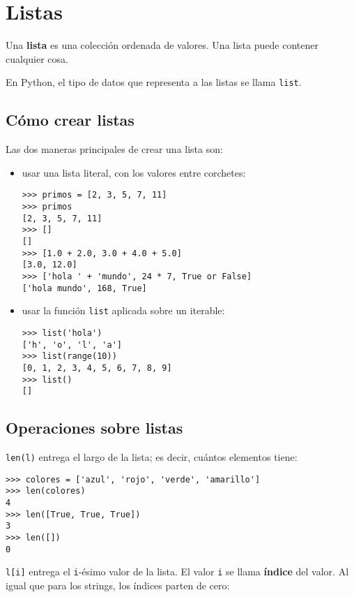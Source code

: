 \section{Listas}

Una \textbf{lista} es una colección ordenada de valores. Una lista puede
contener cualquier cosa.

En Python, el tipo de datos que representa a las listas se llama
\lstinline!list!.

\subsection{Cómo crear listas}

Las dos maneras principales de crear una lista son:

\begin{itemize}
\item
  usar una lista literal, con los valores entre corchetes:

\begin{lstlisting}
>>> primos = [2, 3, 5, 7, 11]
>>> primos
[2, 3, 5, 7, 11]
>>> []
[]
>>> [1.0 + 2.0, 3.0 + 4.0 + 5.0]
[3.0, 12.0]
>>> ['hola ' + 'mundo', 24 * 7, True or False]
['hola mundo', 168, True]
\end{lstlisting}
\end{itemize}

\begin{itemize}
\item
  usar la función \lstinline!list! aplicada sobre un iterable:

\begin{lstlisting}
>>> list('hola')
['h', 'o', 'l', 'a']
>>> list(range(10))
[0, 1, 2, 3, 4, 5, 6, 7, 8, 9]
>>> list()
[]
\end{lstlisting}
\end{itemize}

\subsection{Operaciones sobre listas}

\lstinline!len(l)! entrega el largo de la lista; es decir, cuántos
elementos tiene:

\begin{lstlisting}
>>> colores = ['azul', 'rojo', 'verde', 'amarillo']
>>> len(colores)
4
>>> len([True, True, True])
3
>>> len([])
0
\end{lstlisting}

\lstinline!l[i]! entrega el \lstinline!i!-ésimo valor de la lista. El
valor \lstinline!i! se llama \textbf{índice} del valor. Al igual que
para los strings, los índices parten de cero:

